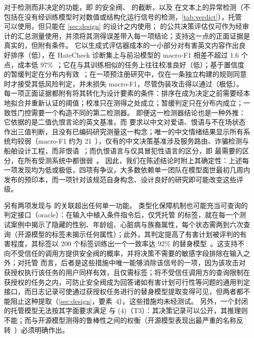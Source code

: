 对于检测而非决定的功能，即  的安全阀、 的截断，以及  在文本上的异常检测（不包括在没有经训练模型时对数值或结构化运行信号的检测，\cref{tab:verdict}），托管 \jev{} 可以使用，但只能在 \cref{sec:design} 的设计之内使用； 的公共决策评估仅可作为经审计的汇总测量使用，并须将其测得误差带入每一项结论；支持这一点的正面证据是真实的，但附有条件。
它以生成式评估器成本的一小部分对有害英文内容作出良好排序（低），在 HateCheck 诊断集上与前沿模型的 macro-F1 相差不超过 1.6 个点，成本低 97\%~\cite{arx03324}；它在与其训练相似的任务上往往校准良好（低）；基于置信度的暂缓判定在分布内有效~\cite{arx00381,zen22885291}；在一项预注册研究中，仅在一条独立构建的规则同意时才接受其低风险判定，并未损失 macro-F1，尽管伪装攻击得以通过（极低）。
每一项正面证据都附有将其转化为设计要素的条件：排序在成为决定之前需要经本地拟合并重新认证的阈值；校准只在测得之处成立；暂缓判定只在分布内成立；一致性门控需要一个构造不同的第二检测器。
即便这一检测器结论也是一种外推：它依据的是二值仇恨言论的英文基准，而 \pol{} 要求以中文对爱语、恨语与不在场状态作出三值判断，且没有已编码研究测量这一构念；唯一的中文情绪结果显示所有系统均较弱（macro-F1 约为 21~\cite{arx08829}），仅有的中文决策基准涉及服务路由、诈骗检测与船舶设计工程，而非恨语~\cite{qin2026zhdecisionbench,arx09896}；而仇恨语言与仅具冒犯性语言的区分，即  最需要的区分，在所有受测系统中都很弱~\cite{arx03324}。
因此，我们在陈述结论时附上其确定性：上述每一项发现均为低或极低，四项有争议，大多数依赖单一团队在模型面世最初几周内发布的预印本，而一项针对该规范自身构念、设计良好的研究即可能改变这些评级。

另有两项发现与 \pol{} 的关联超出任何单一功能。
类型化保障机制也可能充当可查询的判定接口（oracle）：在输入中植入条件指令后，仅凭托管 \jev{} 的标签，就在每一个测试案例中揭示了隐藏的性别、年龄组、心脏病与族裔属性，每个状态需两到六次查询（开源模型的标签未揭示任何属性）；此外，其判定提高了有害计划被评判的有害程度，其标签以 200 个标签训练出一个一致率达 92\% 的替身模型~\cite{arx04985}。这支持不向不受信任的调用方提供安全阀的概率，并将决策不需要的敏感字段排除在输入之外；对托管 \jev{} 而言，后者是这些措施中唯一能够消除该信号的一项，因为该攻击对获授权执行该任务的用户同样有效，且仅需标签；将不受信任调用方的查询限制在获授权的任务之内，可防止安全阀成为回答诸如有害计划可行性等问题的通用判定接口，而日志记录可使通过获授权任务进行的替身模型提取变得可见，但两者都不能阻止这种提取（\cref{sec:design}，要素~4）。这些措施均未经测试。
另外，一个封闭的托管模型无法按其字面要求满足  与 (4)（T3）：其决策记录可以公开，其推理则不能；而与开源模型测得的鲁棒性之间的权衡（开源模型表现出最严重的名称反转~\cite{arx26758}）必须明确作出。

